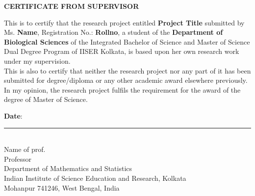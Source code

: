 \begin{center}
  {\Large{\bf{CERTIFICATE FROM SUPERVISOR}}}
\end{center}

\vspace{2em}

This is to certify that the research project entitled \textbf{Project Title} submitted by Ms. \textbf{Name}, Registration No.: \textbf{Rollno}, a student of the \textbf{Department of Biological Sciences} of the Integrated Bachelor of Science and Master of Science Dual Degree Program of IISER Kolkata, is based upon her own research work under my supervision.\\

\noindent
This is also to certify that neither the research project nor any part of it has been submitted for degree/diploma or any other academic award elsewhere previously. In my opinion, the research project fulfils the requirement for the award of the degree of Master of Science.

\vspace{3em} 
\noindent \textbf{Date}:  \hfill   

\vspace{1cm}

\begin{flushleft}
\rule{6cm}{0.4pt}\\
Name of prof.\\
Professor\\
Department of Mathematics and Statistics\\
Indian Institute of Science Education and Research, Kolkata\\
Mohanpur 741246, West Bengal, India
\end{flushleft}

\clearpage

